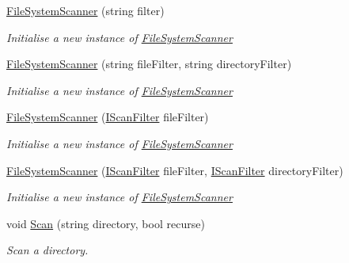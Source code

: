\begin{DoxyCompactItemize}
\item 
\hyperlink{class_i_c_sharp_code_1_1_sharp_zip_lib_1_1_core_1_1_file_system_scanner_ae40391f1917b2f032e3553a655535dbf}{File\+System\+Scanner} (string filter)
\begin{DoxyCompactList}\small\item\em Initialise a new instance of \hyperlink{class_i_c_sharp_code_1_1_sharp_zip_lib_1_1_core_1_1_file_system_scanner}{File\+System\+Scanner} \end{DoxyCompactList}\item 
\hyperlink{class_i_c_sharp_code_1_1_sharp_zip_lib_1_1_core_1_1_file_system_scanner_ac2c2caa4be2b4baacd549a346c7a54fd}{File\+System\+Scanner} (string file\+Filter, string directory\+Filter)
\begin{DoxyCompactList}\small\item\em Initialise a new instance of \hyperlink{class_i_c_sharp_code_1_1_sharp_zip_lib_1_1_core_1_1_file_system_scanner}{File\+System\+Scanner} \end{DoxyCompactList}\item 
\hyperlink{class_i_c_sharp_code_1_1_sharp_zip_lib_1_1_core_1_1_file_system_scanner_a21b4fc424cea246c1bea985c118d077a}{File\+System\+Scanner} (\hyperlink{interface_i_c_sharp_code_1_1_sharp_zip_lib_1_1_core_1_1_i_scan_filter}{I\+Scan\+Filter} file\+Filter)
\begin{DoxyCompactList}\small\item\em Initialise a new instance of \hyperlink{class_i_c_sharp_code_1_1_sharp_zip_lib_1_1_core_1_1_file_system_scanner}{File\+System\+Scanner} \end{DoxyCompactList}\item 
\hyperlink{class_i_c_sharp_code_1_1_sharp_zip_lib_1_1_core_1_1_file_system_scanner_a28d75dbc4b0cb66deeabb6625c1eea60}{File\+System\+Scanner} (\hyperlink{interface_i_c_sharp_code_1_1_sharp_zip_lib_1_1_core_1_1_i_scan_filter}{I\+Scan\+Filter} file\+Filter, \hyperlink{interface_i_c_sharp_code_1_1_sharp_zip_lib_1_1_core_1_1_i_scan_filter}{I\+Scan\+Filter} directory\+Filter)
\begin{DoxyCompactList}\small\item\em Initialise a new instance of \hyperlink{class_i_c_sharp_code_1_1_sharp_zip_lib_1_1_core_1_1_file_system_scanner}{File\+System\+Scanner} \end{DoxyCompactList}\item 
void \hyperlink{class_i_c_sharp_code_1_1_sharp_zip_lib_1_1_core_1_1_file_system_scanner_ad9eababa9baa8beb2f15da9a3bc46820}{Scan} (string directory, bool recurse)
\begin{DoxyCompactList}\small\item\em Scan a directory. \end{DoxyCompactList}\end{DoxyCompactItemize}
